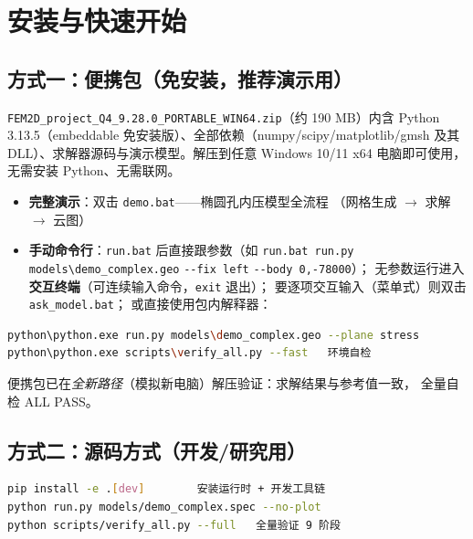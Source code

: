\documentclass[12pt,a4paper]{ctexart}
\newcommand{\fem}{\Verb}
\begin{document}
\section{安装与快速开始}

\subsection{方式一：便携包（免安装，推荐演示用）}

\fem|FEM2D_project_Q4_9.28.0_PORTABLE_WIN64.zip|（约 190 MB）内含
Python 3.13.5（embeddable 免安装版）、全部依赖（numpy/scipy/matplotlib/gmsh
及其 DLL）、求解器源码与演示模型。解压到任意 Windows 10/11 x64 电脑即可使用，
无需安装 Python、无需联网。

\begin{itemize}[leftmargin=*]
  \item \textbf{完整演示}：双击 \fem|demo.bat|——椭圆孔内压模型全流程
        （网格生成 $\rightarrow$ 求解 $\rightarrow$ 云图）
  \item \textbf{手动命令行}：\fem|run.bat| 后直接跟参数（如
        \fem|run.bat run.py models\demo_complex.geo| \fem|--fix left|
        \fem|--body 0,-78000|）；
        无参数运行进入\textbf{交互终端}（可连续输入命令，\fem|exit| 退出）；
        要逐项交互输入（菜单式）则双击 \fem|ask_model.bat|；
        或直接使用包内解释器：
\end{itemize}

\begin{lstlisting}[language=bash]
python\python.exe run.py models\demo_complex.geo --plane stress
python\python.exe scripts\verify_all.py --fast   环境自检
\end{lstlisting}

便携包已在\emph{全新路径}（模拟新电脑）解压验证：求解结果与参考值一致，
全量自检 ALL PASS。

\subsection{方式二：源码方式（开发/研究用）}

\begin{lstlisting}[language=bash]
pip install -e .[dev]        安装运行时 + 开发工具链
python run.py models/demo_complex.spec --no-plot
python scripts/verify_all.py --full   全量验证 9 阶段
\end{lstlisting}
\end{document}
